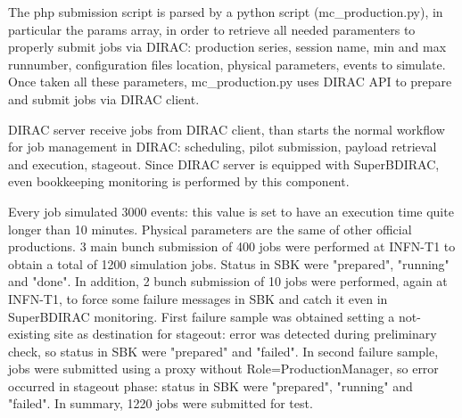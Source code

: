\documentclass[a4paper]{jpconf}
\begin{document}
The php submission script is parsed by a python script (mc\_production.py), in particular the params array, in order to retrieve all needed paramenters to properly submit jobs via DIRAC: production series, session name, min and max runnumber, configuration files location, physical parameters, events to simulate. Once taken all these parameters, mc\_production.py uses DIRAC API to prepare and submit jobs via DIRAC client.

DIRAC server receive jobs from DIRAC client, than starts the normal workflow for job management in DIRAC: scheduling, pilot submission, payload retrieval and execution, stageout. Since DIRAC server is equipped with SuperBDIRAC, even bookkeeping monitoring is performed by this component.




Every job simulated 3000 events: this value is set to have an execution time quite longer than 10 minutes.
Physical parameters are the same of other official productions.
3 main bunch submission of 400 jobs were performed at INFN-T1 to obtain a total of 1200 simulation jobs.
Status in SBK were "prepared", "running" and "done".
In addition, 2 bunch submission of 10 jobs were performed, again at INFN-T1, to force some failure messages in SBK and catch it even in SuperBDIRAC monitoring. First failure sample was obtained setting a not-existing site as destination for stageout: error was detected during preliminary check, so status in SBK were "prepared" and "failed". In second failure sample, jobs were submitted using a proxy without Role=ProductionManager, so error occurred in stageout phase: status in SBK were "prepared", "running" and "failed". In summary, 1220 jobs were submitted for test.\\
\end{document}
